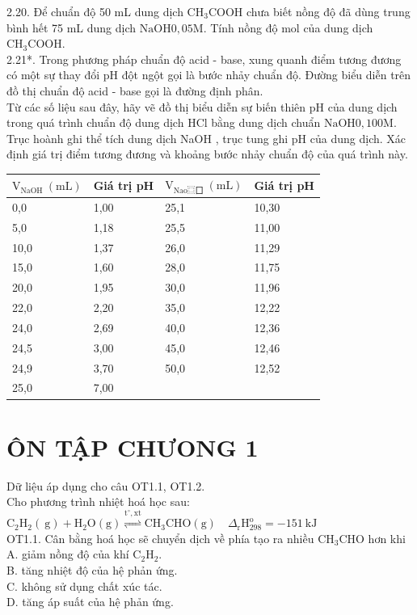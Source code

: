 \documentclass[10pt]{article}
\begin{document}
2.20. Để chuẩn độ 50 mL dung dịch $\mathrm{CH}_{3} \mathrm{COOH}$ chưa biết nồng độ đã dùng trung bình hết 75 mL dung dịch $\mathrm{NaOH} 0,05 \mathrm{M}$. Tính nồng độ mol của dung dịch $\mathrm{CH}_{3} \mathrm{COOH}$.\\
2.21*. Trong phương pháp chuẩn độ acid - base, xung quanh điểm tương đương có một sự thay đổi pH đột ngột gọi là bước nhảy chuẩn độ. Đường biểu diễn trên đồ thị chuẩn độ acid - base gọi là đường định phân.\\
Từ các số liệu sau đây, hãy vẽ đồ thị biểu diễn sự biến thiên pH của dung dịch trong quá trình chuẩn độ dung dịch HCl bằng dung dịch chuẩn $\mathrm{NaOH} 0,100 \mathrm{M}$. Trục hoành ghi thể tích dung dịch NaOH , trục tung ghi pH của dung dịch. Xác định giá trị điểm tương đương và khoảng bước nhảy chuẩn độ của quá trình này.

\begin{center}
\begin{tabular}{|l|l|l|l|}
\hline
$\mathrm{V}_{\text {NaOH }}(\mathrm{mL})$ & Giá trị pH & $\mathrm{V}_{\text {Nao⿴囗 }}(\mathrm{mL})$ & Giá trị pH \\
\hline
0,0 & 1,00 & 25,1 & 10,30 \\
\hline
5,0 & 1,18 & 25,5 & 11,00 \\
\hline
10,0 & 1,37 & 26,0 & 11,29 \\
\hline
15,0 & 1,60 & 28,0 & 11,75 \\
\hline
20,0 & 1,95 & 30,0 & 11,96 \\
\hline
22,0 & 2,20 & 35,0 & 12,22 \\
\hline
24,0 & 2,69 & 40,0 & 12,36 \\
\hline
24,5 & 3,00 & 45,0 & 12,46 \\
\hline
24,9 & 3,70 & 50,0 & 12,52 \\
\hline
25,0 & 7,00 &  &  \\
\hline
\end{tabular}
\end{center}

\section*{ÔN TẬP CHƯONG 1}
Dữ liệu áp dụng cho câu OT1.1, OT1.2.\\
Cho phương trình nhiệt hoá học sau:\\
$\mathrm{C}_{2} \mathrm{H}_{2}(\mathrm{~g})+\mathrm{H}_{2} \mathrm{O}(\mathrm{g}) \stackrel{\mathrm{t}^{\circ}, \mathrm{xt}}{\rightleftharpoons} \mathrm{CH}_{3} \mathrm{CHO}(\mathrm{g}) \quad \Delta_{\mathrm{r}} \mathrm{H}_{298}^{\mathrm{o}}=-151 \mathrm{~kJ}$\\
OT1.1. Cân bằng hoá học sẽ chuyển dịch về phía tạo ra nhiều $\mathrm{CH}_{3} \mathrm{CHO}$ hơn khi\\
A. giảm nồng độ của khí $\mathrm{C}_{2} \mathrm{H}_{2}$.\\
B. tăng nhiệt độ của hệ phản ứng.\\
C. không sử dụng chất xúc tác.\\
D. tăng áp suất của hệ phản ứng.
\end{document}
